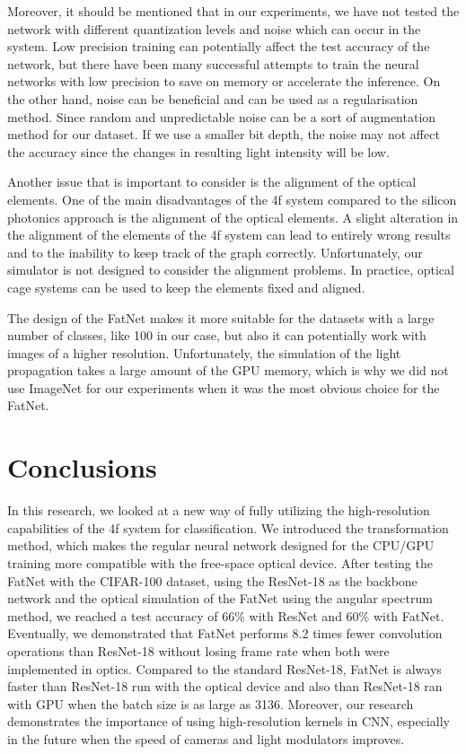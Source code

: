 \documentclass{article}
\begin{document}
Moreover, it should be mentioned that in our experiments, we have not tested the network with different quantization levels and noise which can occur in the system. Low precision training can potentially affect the test accuracy of the network, but there have been many successful attempts to train the neural networks with low precision to save on memory or accelerate the inference. On the other hand, noise can be beneficial and can be used as a regularisation method. Since random and unpredictable noise can be a sort of augmentation method for our dataset. If we use a smaller bit depth, the noise may not affect the accuracy since the changes in resulting light intensity will be low.

Another issue that is important to consider is the alignment of the optical
elements. One of the main disadvantages of the 4f system compared to the silicon photonics approach is the alignment of the optical elements. A slight alteration in the alignment of the elements of the 4f system can lead to entirely wrong results and to the inability to keep track of the graph correctly. Unfortunately, our simulator is not designed to consider the alignment problems. In practice, optical cage systems can be used to keep the elements fixed and aligned. 

The design of the FatNet makes it more suitable for the datasets with a large number of classes, like 100 in our case, but also it can potentially work with images of a higher resolution. Unfortunately, the simulation of the light propagation takes a large amount of the GPU memory, which is why we did not use ImageNet for our experiments when it was the most obvious choice for the FatNet. 

\section{Conclusions}

In this research, we looked at a new way of fully utilizing the high-resolution capabilities of the 4f system for classification. We introduced the transformation method, which makes the regular neural network designed for the CPU/GPU training more compatible with the free-space optical device. After testing the FatNet with the CIFAR-100 dataset, using the ResNet-18 as the backbone network and the optical simulation of the FatNet using the angular spectrum method, we reached a test accuracy of 66\% with ResNet and 60\% with FatNet. Eventually, we demonstrated that FatNet performs 8.2 times fewer convolution operations than ResNet-18 without losing frame rate when both were implemented in optics. Compared to the standard ResNet-18, FatNet is always faster than ResNet-18 run with the optical device and also than ResNet-18 ran with GPU when the batch size is as large as 3136. Moreover, our research demonstrates the importance of using high-resolution kernels in CNN, especially in the future when the speed of cameras and light modulators improves.
\end{document}
